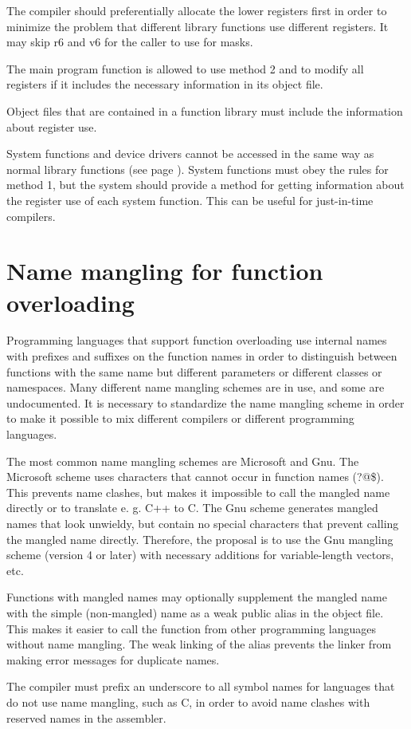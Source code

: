 \documentclass[forwardcom.tex]{subfiles}
\begin{document}
The compiler should preferentially allocate the lower registers first in order to minimize the problem that different library functions use different registers. It may skip r6 and v6 for the caller to use for masks. 
\vspace{2mm}

The main program function is allowed to use method 2 and to modify all registers if it includes the necessary information in its object file. 
\vspace{2mm}

Object files that are contained in a function library must include the information about register use. 
\vspace{2mm}

System functions and device drivers cannot be accessed in the same way as normal library functions (see page \pageref{systemCallIDSystem}). System functions must obey the rules for method 1, but the system should provide a method for getting information about the register use of each system function. This can be useful for just-in-time compilers. 

\section{Name mangling for function overloading} \label{nameMangling}
Programming languages that support function overloading use internal names with prefixes and suffixes on the function names in order to distinguish between functions with the same name but different parameters or different classes or namespaces. Many different name mangling schemes are in use, and some are undocumented. It is necessary to standardize the name mangling scheme in order to make it possible to mix different compilers or different programming languages.
\vspace{2mm}

The most common name mangling schemes are Microsoft and Gnu. The Microsoft scheme uses characters that cannot occur in function names (?@\$). This prevents name clashes, but makes it impossible to call the mangled name directly or to translate e. g. C++ to C. The Gnu scheme generates mangled names that look unwieldy, but contain no special characters that prevent calling the mangled name directly. Therefore, the proposal is to use the Gnu mangling scheme (version 4 or later) with necessary additions for variable-length vectors, etc. 
\vspace{2mm}

Functions with mangled names may optionally supplement the mangled name with the simple (non-mangled) name as a weak public alias in the object file. This makes it easier to call the function from other programming languages without name mangling. The weak linking of the alias prevents the linker from making error messages for duplicate names.
\vspace{2mm}

The compiler must prefix an underscore to all symbol names for languages that do not use name mangling, such as C, in order to avoid name clashes with reserved names in the assembler.
\vspace{2mm}
\end{document}
